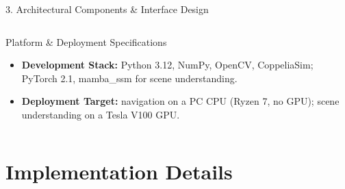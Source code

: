 \documentclass[aspectratio=169, 11pt]{beamer}
\begin{document}
\begin{frame}{3. Architectural Components \& Interface Design}
\begin{columns}[T]
        \begin{block}{Platform \& Deployment Specifications}
            \scriptsize
            \begin{itemize}
                \item \textbf{Development Stack:} Python 3.12, NumPy, OpenCV, CoppeliaSim; PyTorch 2.1, mamba\_ssm for scene understanding.
                \item \textbf{Deployment Target:} navigation on a PC CPU (Ryzen 7, no GPU); scene understanding on a Tesla V100 GPU.
            \end{itemize}
        \end{block}
    \end{columns}
\end{frame}

\section{Implementation Details}
\end{document}
